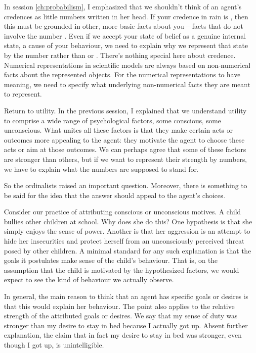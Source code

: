 In session \ref{ch:probabilism}, I emphasized that we shouldn't think
of an agent's credences as little numbers written in her head. If your
credence in rain is , then this must be grounded in
other, more basic facts about you -- facts that do not involve the
number . Even if we accept your state of belief as a
genuine internal state, a cause of your behaviour, we need to explain
why we represent that state by the number  rather than
 or . There's nothing special here
about credence. Numerical representations in scientific models are
always based on non-numerical facts about the represented
objects. For the numerical representations to have meaning, we need to
specify what underlying non-numerical facts they are meant to represent.

Return to utility. In the previous session, I explained that we
understand utility to comprise a wide range of psychological factors,
some conscious, some unconscious. What unites all these factors is
that they make certain acts or outcomes more appealing to the agent:
they motivate the agent to choose these acts or aim at those
outcomes. We can perhaps agree that some of these factors are stronger
than others, but if we want to represent their strength by numbers, we
have to explain what the numbers are supposed to stand for.

So the ordinalists raised an important question. Moreover, there is
something to be said for the idea that the answer should appeal to
the agent's choices. 

Consider our practice of attributing conscious or unconscious
motives. A child bullies other children at school. Why does she do
this? One hypothesis is that she simply enjoys the sense of
power. Another is that her aggression is an attempt to hide her
insecurities and protect herself from an unconsciously perceived
threat posed by  other children. A minimal standard for any such
explanation is that the goals it postulates make sense of the child's
behaviour. That is, on the assumption that the child is motivated by
the hypothesized factors, we would expect to see the kind of behaviour
we actually observe.

In general, the main reason to think that an agent has specific goals
or desires is that this would explain her behaviour. The point also
applies to the relative strength of the attributed goals or
desires. We say that my sense of duty was stronger than my desire to
stay in bed because I actually got up. Absent further explanation, the
claim that in fact my desire to stay in bed was stronger, even though
I got up, is unintelligible.

